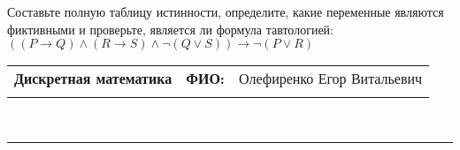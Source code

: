 \documentclass[10pt]{exam}
\newcommand{\class}{Дискретная математика}
\newcommand{\examdate}{}
\begin{document}
\begin{questions}
\begin{enumerate} [a)]
\end{enumerate}\question Составьте полную таблицу истинности, определите, какие переменные являются фиктивными и проверьте, является ли формула тавтологией:
$((P \rightarrow Q) \land (R \rightarrow S) \land \neg (Q \lor S)) \rightarrow \neg (P \lor R)$

\end{questions}
\newpage
\begin{flushright}
\begin{tabular}{p{2.8in} r l}
\textbf{\class} & \textbf{ФИО:} &Олефиренко Егор Витальевич
\\

\textbf{\examdate} &&\\
\end{tabular}\\
\end{flushright}
\rule[1ex]{\textwidth}{.1pt}
\end{document}
